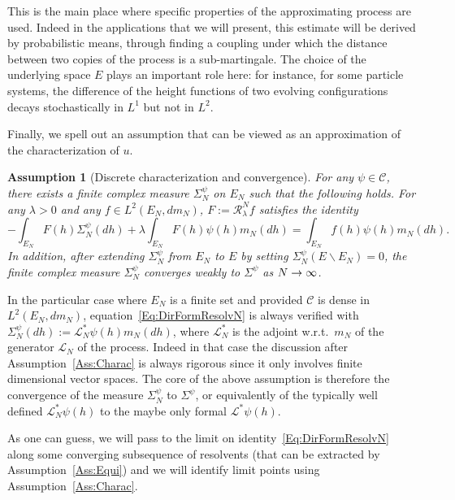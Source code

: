 \documentclass[10pt]{amsart}
\theoremstyle{definition}\newtheorem{defi}[theo]{Definition}\newtheorem{rema}[theo]{Remark}\newtheorem{exam}[theo]{Example}\newtheorem{exem}[theo]{Example}\newtheorem{nota}[theo]{Notation}
\theoremstyle{plain}
\newtheorem{assu}[theo]{Assumption}}
\newcommand{\cC}{\mathcal{C}}
\newcommand{\cL}{\mathcal{L}}
\newcommand{\cR}{\mathcal{R}}
\renewcommand*{\to}{\mathchoice{\longrightarrow}{\rightarrow}{\rightarrow}{\rightarrow}}
\begin{document}
This is the main place where specific properties of the approximating process are used. Indeed in the applications that we will present, this estimate will be derived by probabilistic means, through finding a coupling under which the distance between two copies of the process is a sub-martingale. The choice of the underlying space $E$ plays an important role here: for instance, for some particle systems, the difference of the height functions of two evolving configurations decays stochastically in $L^1$ but not in $L^2$.

Finally, we spell out an assumption that can be viewed as an approximation of the characterization of $u$.

\begin{assu}[Discrete characterization and convergence]\label{Ass:IbPF}
For any $\psi \in \cC$, there exists a finite complex measure $\Sigma_N^{\psi}$ on $E_N$ such that the following holds. For any $\lambda > 0$ and any $f\in L^2(E_N,dm_N)$, $F:=\cR_\lambda^N f$ satisfies the identity
\begin{equation}\label{Eq:DirFormResolvN}
-\int_{E_N} F(h) \Sigma_N^{\psi}(dh) + \lambda \int_{E_N} F(h) \psi(h) m_N(dh) = \int_{E_N} f(h) \psi(h) m_N(dh).
\end{equation}
In addition, after extending $\Sigma_N^{\psi}$ from $E_N$ to $E$ by setting $\Sigma_N^{\psi}(E\backslash E_N)=0$, the finite complex measure $\Sigma_N^{\psi}$ converges weakly to $\Sigma^{\psi}$ as $N\to\infty$.
\end{assu}

In the particular case where $E_N$ is a finite set and provided $\cC$ is dense in\linebreak $L^2(E_N,dm_N)$, equation~\eqref{Eq:DirFormResolvN} is always verified with $\Sigma_N^{\psi}(dh) := \cL^*_N \psi(h) m_N(dh)$, where $\cL^*_N$ is the adjoint w.r.t.~$m_N$ of the generator $\cL_N$ of the process. Indeed in that case the discussion after Assumption~\ref{Ass:Charac} is always rigorous since it only involves finite dimensional vector spaces. The core of the above assumption is therefore the convergence of the measure $\Sigma_N^{\psi}$ to $\Sigma^{\psi}$, or equivalently of the typically well defined $\cL_N^* \psi(h)$ to the maybe only formal $\cL^* \psi(h)$.

As one can guess, we will pass to the limit on identity~\eqref{Eq:DirFormResolvN} along some converging subsequence of resolvents (that can be extracted by Assumption~\ref{Ass:Equi}) and we will identify limit points using Assumption~\ref{Ass:Charac}.
\end{document}
